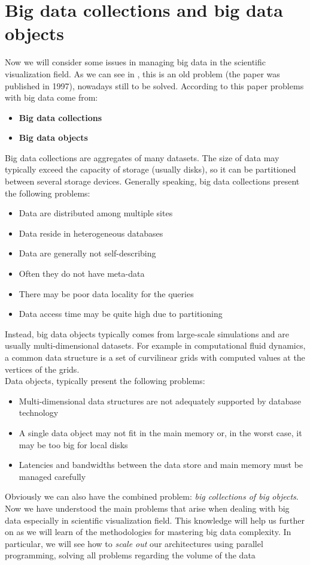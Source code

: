 \section{Big data collections and big data objects}\label{sec12:bigDataCollectionsObjects}

Now we will consider some issues in managing big data in the scientific visualization field. As we can see in \cite{Cox}, this is an old problem (the paper was published in 1997), nowadays still to be solved. According to this paper problems with big data come from:
\begin{itemize}
 \item \textbf{Big data collections}
 \item \textbf{Big data objects}
\end{itemize}

Big data collections are aggregates of many datasets. The size of data may typically exceed the capacity of storage (usually disks), so it can be partitioned between several storage devices. Generally speaking, big data collections present the following problems:
\begin{itemize}
 \item Data are distributed among multiple sites
 \item Data reside in heterogeneous databases
 \item Data are generally not self-describing
 \item Often they do not have meta-data
 \item There may be poor data locality for the queries
 \item Data access time may be quite high due to partitioning
\end{itemize}

Instead, big data objects typically comes from large-scale simulations and are usually multi-dimensional datasets. For example in computational fluid dynamics, a common data structure is a set of curvilinear grids with computed values at the vertices of the grids.\\
Data objects, typically present the following problems:
\begin{itemize}
 \item Multi-dimensional data structures are not adequately supported by database technology
 \item A single data object may not fit in the main memory or, in the worst case, it may be too big for local disks
 \item Latencies and bandwidths between the data store and main memory must be managed carefully
\end{itemize}

Obviously we can also have the combined problem: \textit{big collections of big objects}.\\

Now we have understood the main problems that arise when dealing with big data especially in scientific visualization field. This knowledge will help us further on as we will learn of the methodologies for mastering big data complexity. In particular, we will see how to \textit{scale out} our architectures using parallel programming, solving all problems regarding the volume of the data
